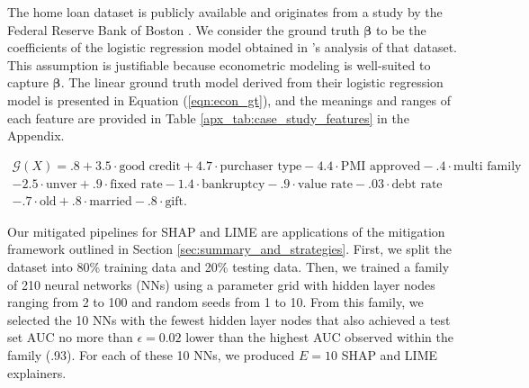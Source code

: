 \documentclass[mnsc,blindrev]{informs3}
\begin{document}
   The home loan dataset is publicly available and originates from a study by the Federal Reserve Bank of Boston \citep{hunter1996cultural}. We consider the ground truth $\boldsymbol{\beta}$ to be the coefficients of the logistic regression model obtained in \cite{bane2006econometric}'s analysis of that dataset. This assumption is justifiable because econometric modeling is well-suited to capture $\boldsymbol{\beta}$. The linear ground truth model derived from their logistic regression model is presented in Equation (\ref{eqn:econ_gt}), and the meanings and ranges of each feature are provided in Table \ref{apx_tab:case_study_features} in the Appendix.  %

    \begin{equation}
    \label{eqn:econ_gt}
    \begin{split}
        \mathcal{G}(X) =.8 + 3.5\cdot \text{good credit} + 4.7\cdot \text{purchaser type} -4.4 \cdot \text{PMI approved} - .4 \cdot \text{multi family} \\ -2.5 \cdot \text{unver} + .9 \cdot \text{fixed rate} - 1.4 \cdot \text{bankruptcy} - .9 \cdot \text{value rate} - .03 \cdot \text{debt rate} \\- .7 \cdot \text{old} + .8 \cdot \text{married} - .8 \cdot \text{gift}.
    \end{split}
    \end{equation}
    
Our mitigated pipelines for SHAP and LIME are applications of the mitigation framework outlined in Section \ref{sec:summary_and_strategies}. First, we split the dataset into 80\% training data and 20\% testing data. Then, we trained a family of 210 neural networks (NNs) using a parameter grid with hidden layer nodes ranging from 2 to 100 and random seeds from 1 to 10. From this family, we selected the 10 NNs with the fewest hidden layer nodes that also achieved a test set AUC no more than $\epsilon = 0.02$ lower than the highest AUC observed within the family (.93). For each of these 10 NNs, we produced $E = 10$ SHAP and LIME explainers.
\end{document}
